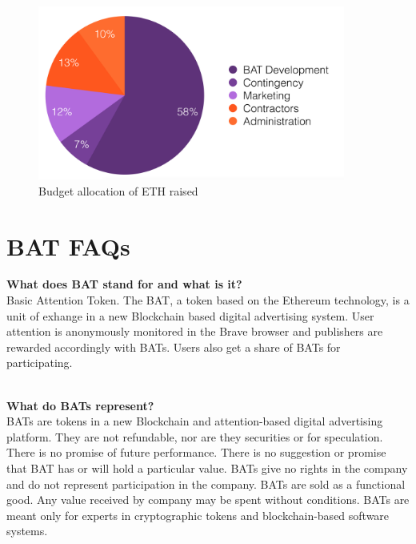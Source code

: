 \documentclass[11pt]{article}
\begin{document}
\begin{figure}
\begin{center}
\includegraphics[width=0.9\textwidth]{BAT_breakdown_piechart.png}
\caption{Budget allocation of ETH raised}
\end{center}
\end{figure}

\pagebreak

\section{\textrm{BAT} FAQs}
\label{sec-7}
\vspace{0.2in}

\vbox{\textbf{\hspace{0.25in}What does \textrm{BAT} stand for and what is it? }\\
Basic Attention Token. The \textrm{BAT}, a token based on the Ethereum technology, is a unit of exhange in a new Blockchain based digital advertising system. User attention is anonymously monitored in the Brave browser and publishers are rewarded accordingly with \textrm{BAT}s. Users also get a share of \textrm{BAT}s for participating. \\
\\
}

\vbox{\textbf{What do \textrm{BAT}s represent?}\\
\textrm{BAT}s are tokens in a new Blockchain and attention-based digital advertising platform. They are not refundable, nor are they securities or for speculation. There is no promise of future performance. There is no suggestion or promise that \textrm{BAT} has or will hold a particular value. \textrm{BAT}s give no rights in the company and do not represent participation in the company. \textrm{BAT}s are sold as a functional good. Any value received by company may be spent without conditions. \textrm{BAT}s are meant only for experts in cryptographic tokens and blockchain-based software systems.\\
\\
}
\end{document}
